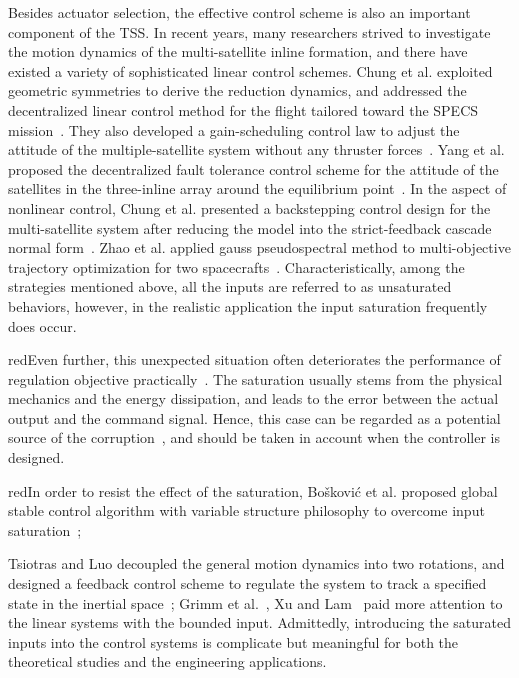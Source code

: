 Besides actuator selection, the effective control scheme is also an important component of the TSS. In recent years, many researchers strived to investigate the motion dynamics of the multi-satellite inline formation, and there have existed a variety of sophisticated linear control schemes. Chung et al. exploited geometric symmetries to derive the reduction dynamics, and addressed the decentralized linear control method for the flight tailored toward the SPECS mission~\cite{chung2007nonlinear}. They also developed a gain-scheduling control law to adjust the attitude of the multiple-satellite system without any thruster forces~\cite{chung2008propellant1}. Yang et al. proposed the decentralized fault tolerance control scheme for the attitude of the satellites in the three-inline array around the equilibrium point~\cite{yang2015decentralized}. In the aspect of nonlinear control, Chung et al. presented a backstepping control design for the multi-satellite system after reducing the model into the strict-feedback cascade normal form~\cite{chung2008propellant2}. Zhao et al. applied gauss pseudospectral method to multi-objective trajectory optimization for two spacecrafts~\cite{zhao2014gauss}. Characteristically, among the strategies mentioned above, all the inputs are referred to as unsaturated behaviors, however, in the realistic application the input saturation frequently does occur. \begin{color}{red}Even further, this unexpected situation often deteriorates the performance of regulation objective practically~\cite{zavala2007natural}. The saturation usually stems from the physical mechanics and the energy dissipation, and leads to the error between the actual output and the command signal. Hence, this case can be regarded as a potential source of the corruption~\cite{Hu2009Robust}, and should be taken in account when the controller is designed.\end{color} \begin{color}{red}In order to resist the effect of the saturation, Bo{\v{s}}kovi{\'{c}} et al. proposed global stable control algorithm with variable structure philosophy to overcome input saturation~\cite{bovskovic2001robust};\end{color} Tsiotras and Luo decoupled the general motion dynamics into two rotations, and designed a feedback control scheme to regulate the system to track a specified state in the inertial space~\cite{tsiotras2000control}; Grimm et al.~\cite{grimm2003antiwindup}, Xu and Lam~\cite{xu2001robust} paid more attention to the linear systems with the bounded input. Admittedly, introducing the saturated inputs into the control systems is complicate but meaningful for both the theoretical studies and the engineering applications.\par
